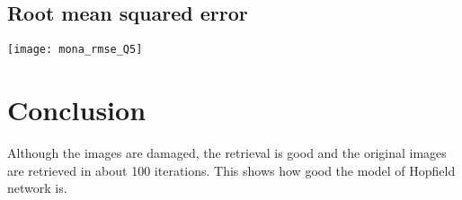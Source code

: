\documentclass[a4paper, 12pt]{article}
\begin{document}
\subsection{Root mean squared error}

\begin{center}
\begin{minipage}{0.5\linewidth}
    \texttt{[image: mona\_rmse\_Q5]}
    \label{fig:Q1_3}
\end{minipage}
\end{center}

\section{Conclusion}

Although the images are damaged, the retrieval is good and the original images are retrieved in about 100 iterations. This shows how good the model of Hopfield network is.
\end{document}
